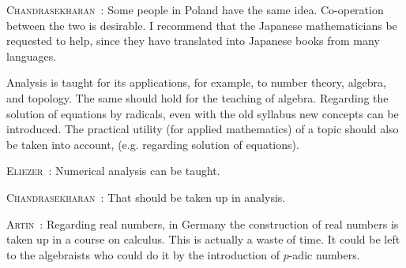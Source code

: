 \smallskip
\noindent
\textsc{Chandrasekharan}~: Some people in Poland have the same idea. Co-operation between the two is desirable. I recommend that the Japanese mathematicians be requested to help, since they have translated into Japanese books from many languages.

Analysis is taught for its applications, for example, to number theory, algebra, and topology. The same should hold for the teaching of algebra. Regarding the solution of equations by radicals, even with the old syllabus new concepts can be introduced. The practical utility (for applied mathematics) of a topic should also be taken into account, (e.g. regarding solution of equations).

\smallskip
\noindent
\textsc{Eliezer}~: Numerical analysis can be taught.

\smallskip
\noindent
\textsc{Chandrasekharan}~: That should be taken up in analysis.

\smallskip
\noindent
\textsc{Artin}~: Regarding real numbers, in Germany the construction of real numbers is taken up in a course on calculus. This is actually a waste of time. It could be left to the algebraists who could do it by the introduction of $p$-adic numbers.


